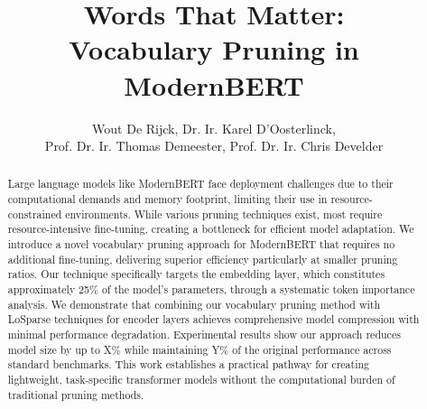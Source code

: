 \documentclass[twocolumn]{article}
\title{\huge \textbf{Words That Matter:\\ Vocabulary Pruning in ModernBERT}}
\author{Wout De Rijck, Dr. Ir. Karel D'Oosterlinck, \\ Prof. Dr. Ir. Thomas Demeester, Prof. Dr. Ir. Chris Develder}
\date{} %
\begin{document}
\maketitle








\begin{abstract}
Large language models like ModernBERT face deployment challenges due to their computational demands and memory footprint, limiting their use in resource-constrained environments. While various pruning techniques exist, most require resource-intensive fine-tuning, creating a bottleneck for efficient model adaptation. We introduce a novel vocabulary pruning approach for ModernBERT that requires no additional fine-tuning, delivering superior efficiency particularly at smaller pruning ratios. Our technique specifically targets the embedding layer, which constitutes approximately 25\% of the model's parameters, through a systematic token importance analysis. We demonstrate that combining our vocabulary pruning method with LoSparse techniques for encoder layers achieves comprehensive model compression with minimal performance degradation. Experimental results show our approach reduces model size by up to X\% while maintaining Y\% of the original performance across standard benchmarks. This work establishes a practical pathway for creating lightweight, task-specific transformer models without the computational burden of traditional pruning methods.
\end{abstract}

\end{document}
